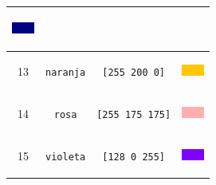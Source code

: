 \begin{center}
\begin{longtable}{|*{4}{c|}}
\begin{minipage}[m]{1.5cm}
\begin{center}
              \includegraphics{Imagenes/05_Primitivas/12_azuloscuro.png}
                      \vspace{0.2cm} \end{center}
                              \end{minipage} \\ \hline
   13 & \texttt{naranja} \index{naranja@\texttt{naranja}}
      & \texttt{[255 200  0]} &  \begin{minipage}[m]{1.5cm} \begin{center}
                 \vspace{0.2cm} %
              \includegraphics{Imagenes/05_Primitivas/13_naranja.png}
                   \vspace{0.2cm} \end{center}
                              \end{minipage} \\ \hline
   14 & \texttt{rosa} \index{rosa@\texttt{rosa}}
      & \texttt{[255 175 175]} & \begin{minipage}[m]{1.5cm} \begin{center}
                 \vspace{0.2cm} %
              \includegraphics{Imagenes/05_Primitivas/14_rosa.png}
                     \vspace{0.2cm} \end{center}
                              \end{minipage} \\ \hline
   15 & \texttt{violeta} \index{violeta@\texttt{violeta}}
      & \texttt{[128  0  255]} & \begin{minipage}[m]{1.5cm} \begin{center}
                 \vspace{0.2cm} %
              \includegraphics{Imagenes/05_Primitivas/15_violeta.png}

\end{center}
\end{minipage}
\end{longtable}
\end{center}
